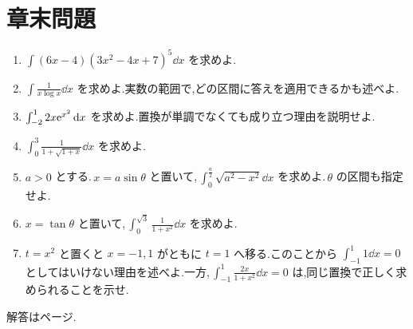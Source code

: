 \section*{章末問題}
\begin{enumerate}[label=\textbf{\thechapter.\arabic*},leftmargin=*]
 \item\label{問:置換べき} $\int(6x-4)(3x^2-4x+7)^5\dd x$ を求めよ.
 \item\label{問:置換二重対数} $\int\frac1{x\log x}\dd x$ を求めよ.実数の範囲で,どの区間に答えを適用できるかも述べよ.
 \item\label{問:置換非単調} $\int_{-2}^1 2x\mathrm{e}^{x^2}\,\mathrm{d} x$ を求めよ.置換が単調でなくても成り立つ理由を説明せよ.
 \item\label{問:置換根号分母} $\int_0^3\frac1{1+\sqrt{1+x}}\dd x$ を求めよ.
 \item\label{問:置換円弧} $a>0$ とする.\,$x=a\sin\theta$ と置いて,\,$\int_0^{\frac a2}\sqrt{a^2-x^2}\dd x$ を求めよ.\,$\theta$ の区間も指定せよ.
 \item\label{問:置換正接} $x=\tan\theta$ と置いて,\,$\int_0^{\sqrt3}\frac1{1+x^2}\dd x$ を求めよ.
 \item\label{問:置換枝の違い} $t=x^2$ と置くと $x=-1,1$ がともに $t=1$ へ移る.このことから $\int_{-1}^1 1\dd x=0$ としてはいけない理由を述べよ.一方,\,$\int_{-1}^1\frac{2x}{1+x^2}\dd x=0$ は,同じ置換で正しく求められることを示せ.
\end{enumerate}

\smallskip\noindent 解答は\pageref{解答:第6章}ページ.

